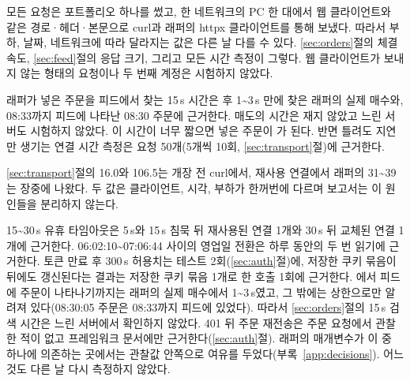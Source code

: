 \seclabel
{}

 모든 요청은 포트폴리오 하나를 썼고, 한 네트워크의 PC 한 대에서 웹 클라이언트와 같은 경로·헤더·본문으로 curl과 래퍼의 httpx 클라이언트를 통해 보냈다. 따라서 부하, 날짜, 네트워크에 따라 달라지는 값은 다른 날 다를 수 있다. \ref{sec:orders}절의 체결 속도, \ref{sec:feed}절의 응답 크기, 그리고 모든 시간 측정이 그렇다. 웹 클라이언트가 보내지 않는 형태의 요청이나 두 번째 계정은 시험하지 않았다.

 래퍼가 넣은 주문을 피드에서 찾는 15\,s 시간은  후 1\textasciitilde 3\,s 만에 찾은 래퍼의 실제 매수와, 08:33까지 피드에 나타난 08:30 주문에 근거한다. 매도의 시간은 재지 않았고 느린 서버도 시험하지 않았다. 이 시간이 너무 짧으면 넣은 주문이 가 된다. 반면 틀려도 지연만 생기는 연결 시간 측정은 요청 50개(5개씩 10회, \ref{sec:transport}절)에 근거한다.

 \ref{sec:transport}절의 16.0\ms{}와 106.5\ms{}는 개장 전 curl에서, 재사용 연결에서 래퍼의 31\textasciitilde 39\ms{}는 장중에 나왔다. 두 값은 클라이언트, 시각, 부하가 한꺼번에 다르며 보고서는 이 원인들을 분리하지 않는다.

 15\textasciitilde 30\,s 유휴 타임아웃은 5\,s와 15\,s 침묵 뒤 재사용된 연결 1개와 30\,s 뒤 교체된 연결 1개에 근거한다. 06:02:10\textasciitilde 07:06:44 사이의 영업일 전환은 하루 동안의  두 번 읽기에 근거한다. 토큰 만료 후 300\,s 허용치는 테스트 2회(\ref{sec:auth}절)에, 저장한 쿠키 묶음이  뒤에도 갱신된다는 결과는 저장한 쿠키 묶음 1개로 한 호출 1회에 근거한다. 에서 피드에 주문이 나타나기까지는 래퍼의 실제 매수에서 1\textasciitilde 3\,s였고, 그 밖에는 상한으로만 알려져 있다(08:30:05 주문은 08:33까지 피드에 있었다). 따라서 \ref{sec:orders}절의 15\,s 검색 시간은 느린 서버에서 확인하지 않았다. 401 뒤 주문 재전송은 주문 요청에서 관찰한 적이 없고 프레임워크 문서에만 근거한다(\ref{sec:auth}절). 래퍼의 매개변수가 이 중 하나에 의존하는 곳에서는 관찰값 안쪽으로 여유를 두었다(부록~\ref{app:decisions}). 어느 것도 다른 날 다시 측정하지 않았다.

